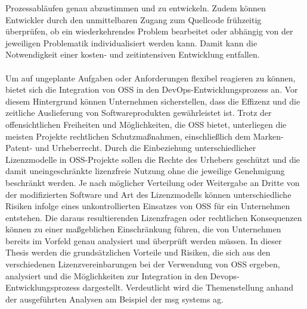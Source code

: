 Prozessabläufen genau abzustimmen und zu entwickeln. Zudem können Entwickler durch den unmittelbaren Zugang zum Quellcode frühzeitig überprüfen, ob ein wiederkehrendes Problem bearbeitet oder abhängig von der jeweiligen Problematik individualisiert werden kann. Damit kann die Notwendigkeit einer kosten- und zeitintensiven Entwicklung entfallen.\\\\ Um auf ungeplante Aufgaben oder Anforderungen flexibel reagieren zu können, bietet sich die Integration von OSS in den DevOps-Entwicklungsprozess an. Vor diesem Hintergrund können Unternehmen sicherstellen, dass die Effizenz und die zeitliche Auslieferung von Softwareprodukten gewährleistet ist. Trotz der offensichtlichen Freiheiten und Möglichkeiten, die OSS bietet, unterliegen die meisten Projekte rechtlichen Schutzmaßnahmen, einschließlich dem Marken- Patent- und Urheberrecht. Durch die Einbeziehung unterschiedlicher Lizenzmodelle in OSS-Projekte sollen die Rechte des Urhebers geschützt und die damit uneingeschränkte lizenzfreie Nutzung ohne die jeweilige Genehmigung beschränkt werden. Je nach möglicher Verteilung oder Weitergabe an Dritte von der modifizierten Software und Art des Lizenzmodells können unterschiedliche Risiken infolge eines unkontrollierten Einsatzes von OSS für ein Unternehmen entstehen. Die daraus resultierenden Lizenzfragen oder rechtlichen Konsequenzen können zu einer maßgeblichen Einschränkung führen, die von Unternehmen bereits im Vorfeld genau analysiert und überprüft werden müssen. In dieser Thesis werden die grundsätzlichen Vorteile und Risiken, die sich aus den verschiedenen Lizenzvereinbarungen bei der Verwendung von OSS ergeben, analysiert und die Möglichkeiten zur Integration in den Devops-Entwicklungsprozess dargestellt. Verdeutlicht wird die Themenstellung anhand der ausgeführten Analysen am Beispiel der msg systems ag.


